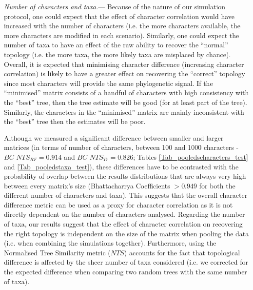 \documentclass[12pt,letterpaper]{article}
\renewcommand{\subsubsection}[1]{%
\vspace{2ex}
\noindent
\textit{#1.}---}
\begin{document}
\subsubsection{Number of characters and taxa}
Because of the nature of our simulation protocol, one could expect that the effect of character correlation would have increased with the number of characters (i.e. the more characters available, the more characters are modified in each scenario).
Similarly, one could expect the number of taxa to have an effect of the raw ability to recover the ``normal'' topology (i.e. the more taxa, the more likely taxa are misplaced by chance).
Overall, it is expected that minimising character difference (increasing character correlation) is likely to have a greater effect on recovering the ``correct'' topology since most characters will provide the same phylogenetic signal.
If the ``minimised'' matrix consists of a handful of characters with high consistency with the ``best'' tree, then the tree estimate will be good (for at least part of the tree).
Similarly, the characters in the ``minimised'' matrix are mainly inconsistent with the ``best'' tree then the estimates will be poor.

Although we measured a significant difference between smaller and larger matrices (in terms of number of characters, between 100 and 1000 characters - $BC$ $NTS_{RF}=0.914$ and $BC$ $NTS_{Tr}=0.826$; Tables \ref{Tab_pooledscharacters_test} and \ref{Tab_pooledstaxa_test}),
these differences have to be contrasted with the probability of overlap between the results distributions that are always very high between every matrix's size (Bhattacharrya Coefficients $>0.949$ for both the different number of characters and taxa).
This suggests that the overall character difference metric can be used as a proxy for character correlation as it is not directly dependent on the number of characters analysed.
Regarding the number of taxa, our results suggest that the effect of character correlation on recovering the right topology is independent on the size of the matrix when pooling the data (i.e. when combining the simulations together).
Furthermore, using the Normalised Tree Similarity metric ($NTS$) accounts for the fact that topological difference is affected by the sheer number of taxa considered (i.e. we corrected for the expected difference when comparing two random trees with the same number of taxa).
\end{document}
